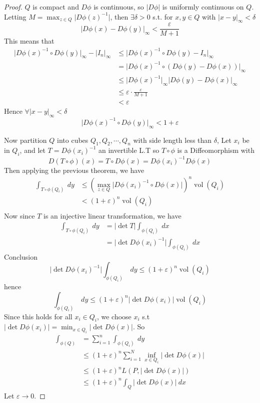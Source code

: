 \documentclass[11pt,a4paper]{article}
\theoremstyle{definition}
\theoremstyle{plain}
\theoremstyle{remark}
\newcommand{\abs}[1]{\lvert #1 \rvert}
\newcommand{\vol}{\operatorname{vol}}
\begin{document}
\begin{proof}
    $Q$ is compact and $D\phi$ is continuous, so $\abs{D\phi}$ is uniformly continuous 
    on $Q$. Letting $M = \max_{z \in Q} \abs{D\phi(z)^{-1}}$, then $\exists \delta > 0$ s.t. 
    for $x,y \in Q$ with $\abs{x-y}_\infty < \delta$ 
    $$\abs{D\phi(x) - D\phi(y)}_\infty < \frac{\varepsilon}{M+1}$$
    This means that 
    \begin{align*}
        \abs{D\phi(x)^{-1} \circ D\phi(y)}_\infty - \abs{I_n}_\infty &\le \abs{D\phi(x)^{-1} \circ D\phi(y) - I_n}_\infty \\
        &= \abs{D\phi(x)^{-1} \circ (D\phi(y) - D\phi(x))}_\infty \\
        &\le \abs{D\phi(x)^{-1}}_\infty \abs{D\phi(y) - D\phi(x)}_\infty \\
        &\le \varepsilon \cdot \frac{\varepsilon}{M+1} \\
        &< \varepsilon
    \end{align*}
    Hence $\forall \abs{x-y}_\infty < \delta$
    $$\abs{D\phi(x)^{-1} \circ D\phi(y)}_\infty < 1 + \varepsilon$$
    
    Now partition $Q$ into cubes $Q_1, Q_2, \cdots, Q_n$ with side length less than $\delta$, 
    Let $x_i$ be in $Q_i$, and let $T = D\phi(x_i)^{-1}$ an invertible L.T so $T \circ \phi$ is a Diffeomorphism with 
    $$D (T \circ \phi) (x) = T \circ D \phi (x) = D \phi(x_i)^{-1} D\phi(x)$$
    Then applying the previous theorem, we have 
    \begin{align*}
        \int_{T \circ \phi (Q_i)} \ dy &\le (\max_{z \in Q} \abs{D\phi(x_i)^{-1} \circ D\phi(x)})^n \vol (Q_i) \\
        &<(1+\varepsilon)^n \vol (Q_i) \\
    \end{align*}  
    Now since $T$ is an injective linear transformation, we have 
    \begin{align*}
        \int_{T \circ \phi(Q_i)} \ dy &= \abs{\det T} \int_{\phi(Q_i)} \ dx \\
        &= \abs{\det D\phi(x_i)^{-1}} \int_{\phi(Q_i)} \ dx 
    \end{align*}
    Conclusion 
    $$\abs{\det D\phi(x_i)^{-1}} \int_{\phi(Q_i)} \ dy \le (1+ \varepsilon)^n \vol (Q_i)$$
    hence 
    $$\int_{\phi(Q_i)} \ dy \le (1 + \varepsilon)^n \abs{\det D\phi(x_i)} \vol (Q_i)$$
    Since this holds for all $x_i \in Q_i$, we choose $x_i$ s.t 
    $\abs{\det D\phi(x_i)} = \min_{x \in Q_i} \abs{\det D\phi(x)}$. So 
    \begin{align*}
        \int_{\phi(Q)} &= \sum_{i=1}^n \int_{\phi(Q_i)} \ dy \\
        &\le (1+\varepsilon)^n \sum_{i=1}^N \inf_{x \in Q_i} \abs{\det D\phi(x)} \\
        &\le (1+ \varepsilon)^n L(P, \abs{\det D\phi(x)}) \\
        &\le (1+ \varepsilon)^n \int_{Q} \abs{\det D\phi(x)} \ dx 
    \end{align*}
    Let $\varepsilon \to 0$. 
\end{proof}
\end{document}
